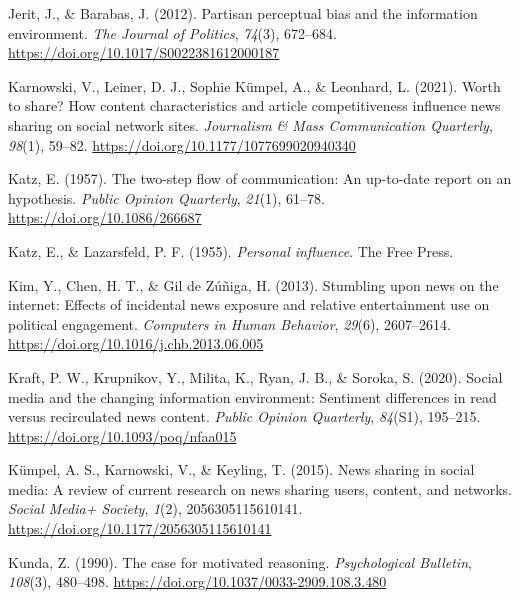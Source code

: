 \documentclass[
  12pt,
]{article}
\newlength{\cslhangindent}
\newlength{\cslentryspacingunit} %
\newenvironment{CSLReferences}[2] %
 {%
  \setlength{\parindent}{0pt}
  \ifodd #1
  \let\oldpar\par
  \def\par{\hangindent=\cslhangindent\oldpar}
  \fi
  \setlength{\parskip}{#2\cslentryspacingunit}
 }%
 {}
\begin{document}
\begin{CSLReferences}{1}{0}
\leavevmode{}%
Jerit, J., \& Barabas, J. (2012). Partisan perceptual bias and the
information environment. \emph{The Journal of Politics}, \emph{74}(3),
672--684. \url{https://doi.org/10.1017/S0022381612000187}

\leavevmode{}%
Karnowski, V., Leiner, D. J., Sophie Kümpel, A., \& Leonhard, L. (2021).
Worth to share? How content characteristics and article competitiveness
influence news sharing on social network sites. \emph{Journalism \& Mass
Communication Quarterly}, \emph{98}(1), 59--82.
\url{https://doi.org/10.1177/1077699020940340}

\leavevmode{}%
Katz, E. (1957). The two-step flow of communication: An up-to-date
report on an hypothesis. \emph{Public Opinion Quarterly}, \emph{21}(1),
61--78. \url{https://doi.org/10.1086/266687}

\leavevmode{}%
Katz, E., \& Lazarsfeld, P. F. (1955). \emph{Personal influence}. The
Free Press.

\leavevmode{}%
Kim, Y., Chen, H. T., \& Gil de Zúñiga, H. (2013). Stumbling upon news
on the internet: Effects of incidental news exposure and relative
entertainment use on political engagement. \emph{Computers in Human
Behavior}, \emph{29}(6), 2607--2614.
\url{https://doi.org/10.1016/j.chb.2013.06.005}

\leavevmode{}%
Kraft, P. W., Krupnikov, Y., Milita, K., Ryan, J. B., \& Soroka, S.
(2020). Social media and the changing information environment: Sentiment
differences in read versus recirculated news content. \emph{Public
Opinion Quarterly}, \emph{84}(S1), 195--215.
\url{https://doi.org/10.1093/poq/nfaa015}

\leavevmode{}%
Kümpel, A. S., Karnowski, V., \& Keyling, T. (2015). News sharing in
social media: A review of current research on news sharing users,
content, and networks. \emph{Social Media+ Society}, \emph{1}(2),
2056305115610141. \url{https://doi.org/10.1177/2056305115610141}

\leavevmode{}%
Kunda, Z. (1990). The case for motivated reasoning. \emph{Psychological
Bulletin}, \emph{108}(3), 480--498.
\url{https://doi.org/10.1037/0033-2909.108.3.480}


\end{CSLReferences}
\end{document}
